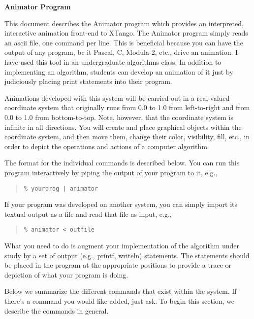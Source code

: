
\textheight 9in
\textwidth 6in
\topmargin -0.5in
\oddsidemargin 0.25in
\evensidemargin 0.25in

\newcommand{\quest}{\vspace{3ex}\noindent}



\vspace*{.3in}

\begin{center}
{\Large\bf Animator Program}
\end{center}

This document describes the Animator program which provides an
interpreted, interactive animation front-end to XTango.  The Animator
program simply reads an ascii file, one command per line.  This is
beneficial because you can have the output of any program, be it
Pascal, C, Modula-2, etc., drive an animation.  I have used this tool
in an undergraduate algorithms class.  In addition to implementing an
algorithm, students can develop an animation of it just by judiciously
placing print statements into their program.

Animations developed with this system will be carried out in a
real-valued coordinate system that originally runs from 0.0 to 1.0
from left-to-right and from 0.0 to 1.0 from bottom-to-top.  Note,
however, that the coordinate system is infinite in all directions.
You will create and place graphical objects within the coordinate
system, and then move them, change their color, visibility, fill,
etc., in order to depict the operations and actions of a computer
algorithm.

The format for the individual commands is
described below.  You can run this program interactively by piping the
output of your program to it, e.g., 
\begin{quote}
{\tt \% yourprog | animator}
\end{quote}
If your program was developed on another system, you can simply import
its textual output as a file and read that file as input, e.g.,
\begin{quote}
{\tt \% animator < outfile}
\end{quote}
What you need to do is augment your implementation of the algorithm
under study by a set of output (e.g., printf, writeln) statements.
The statements should be placed in the program at the appropriate
positions to provide a trace or depiction of what your program is
doing. 

Below we summarize the different commands that exist within the
system.  If there's a command you would like added, just ask.  To
begin this section, we describe the commands in general.  


